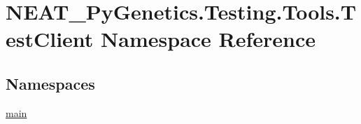 \hypertarget{namespaceNEAT__PyGenetics_1_1Testing_1_1Tools_1_1TestClient}{}\section{N\+E\+A\+T\+\_\+\+Py\+Genetics.\+Testing.\+Tools.\+Test\+Client Namespace Reference}
\label{namespaceNEAT__PyGenetics_1_1Testing_1_1Tools_1_1TestClient}
\subsection*{Namespaces}
\begin{DoxyCompactItemize}
\item 
 \hyperlink{namespaceNEAT__PyGenetics_1_1Testing_1_1Tools_1_1TestClient_1_1main}{main}
\end{DoxyCompactItemize}
